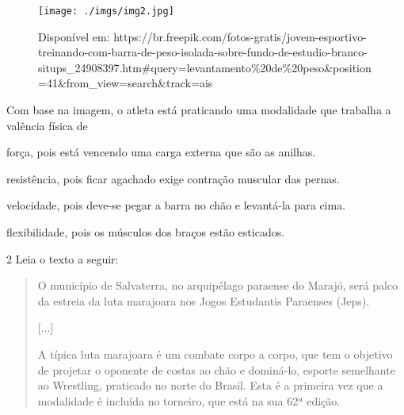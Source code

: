 \begin{figure}[htpb!]
\texttt{[image: ./imgs/img2.jpg]}
\caption{Disponível em:
https://br.freepik.com/fotos-gratis/jovem-esportivo-treinando-com-barra-de-peso-isolada-sobre-fundo-de-estudio-branco-situps\_24908397.htm\#query=levantamento\%20de\%20peso\&position=41\&from\_view=search\&track=ais}
\end{figure}

Com base na imagem, o atleta está praticando uma modalidade que trabalha
a valência física de

\begin{escolha}
\item força, pois está vencendo uma carga externa que são as anilhas.

\item resistência, pois ficar agachado exige contração muscular das pernas.

\item velocidade, pois deve-se pegar a barra no chão e levantá-la para
cima.

\item flexibilidade, pois os músculos dos braços estão esticados.
\end{escolha}


\num{2} Leia o texto a seguir:

\begin{quote}
O município de Salvaterra, no arquipélago paraense do Marajó, será palco
da estreia da luta marajoara nos Jogos Estudantis Paraenses (Jeps).

{[}...{]}

A típica luta marajoara é um combate corpo a corpo, que tem o objetivo
de projetar o oponente de costas ao chão e dominá-lo, esporte semelhante
ao Wrestling, praticado no norte do Brasil. Esta é a primeira vez que a
modalidade é incluída no torneiro, que está na sua 62ª edição.

\end{quote}

